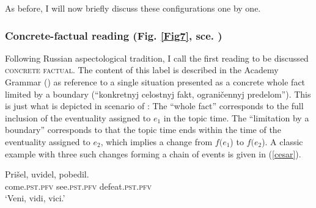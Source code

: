 \documentclass[output=paper,colorlinks,citecolor=brown]{langscibook}
\begin{document}
As before, I will now briefly discuss these configurations one by one. 

\subsubsection{Concrete-factual reading (Fig. \ref{Fig7}, sce. )}\label{cfr}
Following Russian aspectological tradition, I call the first reading to be discussed \textsc{concrete factual}. 
The content of this label is described in the Academy Grammar (\citealt[604]{Svedova1980}) 
as reference to a single situation presented as a 
concrete whole fact limited by a boundary
(``konkretnyj celostnyj fakt, ograničennyj predelom'').
This is just what is depicted in scenario  of :
The ``whole fact'' corresponds to the full inclusion of the eventuality assigned to $e_1$
in the topic time. The ``limitation by a boundary'' corresponds to that the topic time ends within the time of the eventuality assigned to $e_2$, which implies a change from $f(e_1$) to
$f(e_2$). A classic example with three such changes forming a chain of events is given in (\ref{cesar}). 

\ea\label{cesar}
\gll Prišel,
uvidel, pobedil. \\
come.\textsc{pst.pfv} see.\textsc{pst.pfv} 
defeat.\textsc{pst.pfv}  \\
\glt `Veni, vidi, vici.' 
\z 
\end{document}
